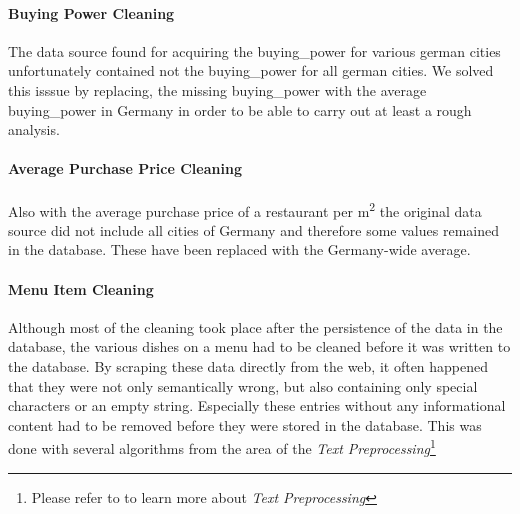\paragraph{Buying Power Cleaning}
The data source found for acquiring the buying\_power for various german cities unfortunately contained not the buying\_power for all german cities.
We solved this isssue by replacing, the missing buying\_power with the average buying\_power in Germany in order to be able to carry out at least a rough analysis.
\paragraph{Average Purchase Price Cleaning}
Also with the average purchase price of a restaurant per m\textsuperscript{2} the original data source did not include all cities of Germany and therefore
some  values remained in the database.
These have been replaced with the Germany-wide average.
\paragraph{Menu Item Cleaning}
Although most of the cleaning took place after the persistence of the data in the database, the various dishes on a menu had to be
cleaned before it was written to the database.
By scraping these data directly from the web, it often happened that they were not only semantically wrong, but also containing only
special characters or an empty string.
Especially these entries without any informational content had to be removed before they were stored in the database.
This was done with several algorithms from the area of the \textit{Text Preprocessing}\footnote{Please refer to  to learn more about \textit{Text Preprocessing}}
